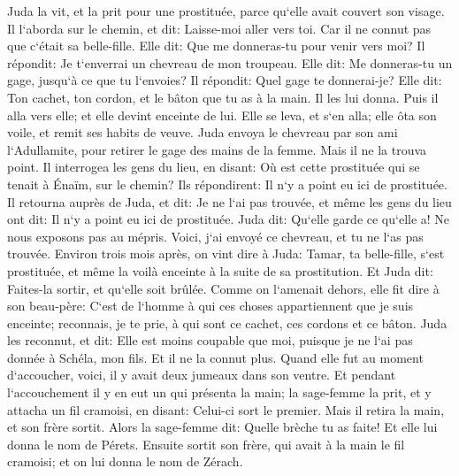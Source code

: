 \verse Juda la vit, et la prit pour une prostituée, parce qu`elle avait couvert son visage. 
\verse Il l`aborda sur le chemin, et dit: Laisse-moi aller vers toi. Car il ne connut pas que c`était sa belle-fille. Elle dit: Que me donneras-tu pour venir vers moi? 
\verse Il répondit: Je t`enverrai un chevreau de mon troupeau. Elle dit: Me donneras-tu un gage, jusqu`à ce que tu l`envoies? 
\verse Il répondit: Quel gage te donnerai-je? Elle dit: Ton cachet, ton cordon, et le bâton que tu as à la main. Il les lui donna. Puis il alla vers elle; et elle devint enceinte de lui. 
\verse Elle se leva, et s`en alla; elle ôta son voile, et remit ses habits de veuve. 
\verse Juda envoya le chevreau par son ami l`Adullamite, pour retirer le gage des mains de la femme. Mais il ne la trouva point. 
\verse Il interrogea les gens du lieu, en disant: Où est cette prostituée qui se tenait à Énaïm, sur le chemin? Ils répondirent: Il n`y a point eu ici de prostituée. 
\verse Il retourna auprès de Juda, et dit: Je ne l`ai pas trouvée, et même les gens du lieu ont dit: Il n`y a point eu ici de prostituée. 
\verse Juda dit: Qu`elle garde ce qu`elle a! Ne nous exposons pas au mépris. Voici, j`ai envoyé ce chevreau, et tu ne l`as pas trouvée. 
\verse Environ trois mois après, on vint dire à Juda: Tamar, ta belle-fille, s`est prostituée, et même la voilà enceinte à la suite de sa prostitution. Et Juda dit: Faites-la sortir, et qu`elle soit brûlée. 
\verse Comme on l`amenait dehors, elle fit dire à son beau-père: C`est de l`homme à qui ces choses appartiennent que je suis enceinte; reconnais, je te prie, à qui sont ce cachet, ces cordons et ce bâton. 
\verse Juda les reconnut, et dit: Elle est moins coupable que moi, puisque je ne l`ai pas donnée à Schéla, mon fils. Et il ne la connut plus. 
\verse Quand elle fut au moment d`accoucher, voici, il y avait deux jumeaux dans son ventre. 
\verse Et pendant l`accouchement il y en eut un qui présenta la main; la sage-femme la prit, et y attacha un fil cramoisi, en disant: Celui-ci sort le premier. 
\verse Mais il retira la main, et son frère sortit. Alors la sage-femme dit: Quelle brèche tu as faite! Et elle lui donna le nom de Pérets. 
\verse Ensuite sortit son frère, qui avait à la main le fil cramoisi; et on lui donna le nom de Zérach. 

